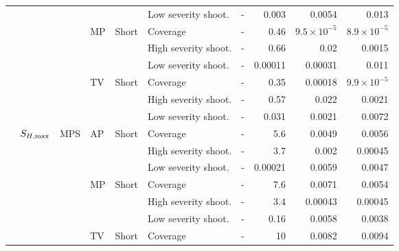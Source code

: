\documentclass[article]{standalone}
\begin{document}
\begin{tabular}{llllllrrrr}
             &                   &    &    &       & Low severity shoot. &                    - &     0.003 &               0.0054 &                 0.013 \\
             &                   &    & MP & Short & Coverage &                    - &      0.46 & $9.5 \times 10^{-5}$ &  $8.9 \times 10^{-5}$ \\
             &                   &    &    &       & High severity shoot. &                    - &      0.66 &                 0.02 &                0.0015 \\
             &                   &    &    &       & Low severity shoot. &                    - &   0.00011 &              0.00031 &                 0.011 \\
             &                   &    & TV & Short & Coverage &                    - &      0.35 &              0.00018 &  $9.9 \times 10^{-5}$ \\
             &                   &    &    &       & High severity shoot. &                    - &      0.57 &                0.022 &                0.0021 \\
             &                   &    &    &       & Low severity shoot. &                    - &     0.031 &               0.0021 &                0.0072 \\
             & $S_{H, \rm{max}}$ & MPS & AP & Short & Coverage &                    - &       5.6 &               0.0049 &                0.0056 \\
             &                   &    &    &       & High severity shoot. &                    - &       3.7 &                0.002 &               0.00045 \\
             &                   &    &    &       & Low severity shoot. &                    - &   0.00021 &               0.0059 &                0.0047 \\
             &                   &    & MP & Short & Coverage &                    - &       7.6 &               0.0071 &                0.0054 \\
             &                   &    &    &       & High severity shoot. &                    - &       3.4 &              0.00043 &               0.00045 \\
             &                   &    &    &       & Low severity shoot. &                    - &      0.16 &               0.0058 &                0.0038 \\
             &                   &    & TV & Short & Coverage &                    - &        10 &               0.0082 &                0.0094 \\

\end{tabular}
\end{document}
